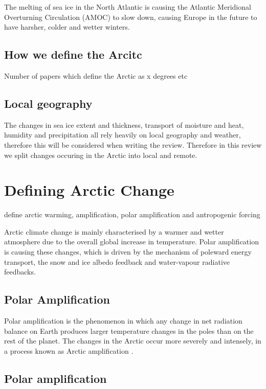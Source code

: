 \documentclass[11pt, oneside]{article}
\begin{document}
The melting of sea ice in the North Atlantic is causing the Atlantic Meridional Overturning Circulation (AMOC) to slow down, causing Europe in the future to have harsher, colder and wetter winters. 


\subsection{How we define the Arcitc}
Number of papers which define the Arctic as x degrees etc 
\subsection{Local geography}
The changes in sea ice extent and thickness, transport of moisture and heat, humidity and precipitation all rely heavily on local geography and weather, therefore this will be considered when writing the review.
Therefore in this review we split changes occuring in the Arctic into local and remote. 

\section{Defining Arctic Change}
define arctic warming, amplification, polar amplification and antropogenic forcing 

Arctic climate change is mainly characterised by a warmer and wetter atmosphere due to the overall global increase in temperature. Polar amplification is causing these changes, which is driven by the mechanism of poleward energy transport, the snow and ice albedo feedback and water-vapour radiative feedbacks. 


\subsection{Polar Amplification}
Polar amplification is the phenomenon in which any change in net radiation balance on Earth produces larger temperature changes in the poles than on the rest of the planet. The changes in the Arctic occur more severely and intensely, in a process known as Arctic amplification \cite{england2021recent}.



\subsection{Polar amplification}\label{polar_amplification}
{\color{blue}{How this effects 
- seasons
- sea ice changes }}
\end{document}
